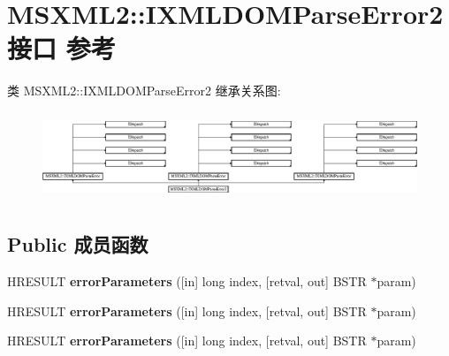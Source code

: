 \hypertarget{interface_m_s_x_m_l2_1_1_i_x_m_l_d_o_m_parse_error2}{}\section{M\+S\+X\+M\+L2\+:\+:I\+X\+M\+L\+D\+O\+M\+Parse\+Error2接口 参考}
\label{interface_m_s_x_m_l2_1_1_i_x_m_l_d_o_m_parse_error2}
类 M\+S\+X\+M\+L2\+:\+:I\+X\+M\+L\+D\+O\+M\+Parse\+Error2 继承关系图\+:\begin{figure}[H]
\begin{center}
\leavevmode
\includegraphics[height=2.679426cm]{interface_m_s_x_m_l2_1_1_i_x_m_l_d_o_m_parse_error2}
\end{center}
\end{figure}
\subsection*{Public 成员函数}
\begin{DoxyCompactItemize}
\item 
\mbox{\label{interface_m_s_x_m_l2_1_1_i_x_m_l_d_o_m_parse_error2_ac2a2208f51e702f0f70ab7ea0a133f23}} 
H\+R\+E\+S\+U\+LT {\bfseries error\+Parameters} (\mbox{[}in\mbox{]} long index, \mbox{[}retval, out\mbox{]} B\+S\+TR $\ast$param)
\item 
\mbox{\label{interface_m_s_x_m_l2_1_1_i_x_m_l_d_o_m_parse_error2_ac2a2208f51e702f0f70ab7ea0a133f23}} 
H\+R\+E\+S\+U\+LT {\bfseries error\+Parameters} (\mbox{[}in\mbox{]} long index, \mbox{[}retval, out\mbox{]} B\+S\+TR $\ast$param)
\item 
\mbox{\label{interface_m_s_x_m_l2_1_1_i_x_m_l_d_o_m_parse_error2_ac2a2208f51e702f0f70ab7ea0a133f23}} 
H\+R\+E\+S\+U\+LT {\bfseries error\+Parameters} (\mbox{[}in\mbox{]} long index, \mbox{[}retval, out\mbox{]} B\+S\+TR $\ast$param)
\end{DoxyCompactItemize}
